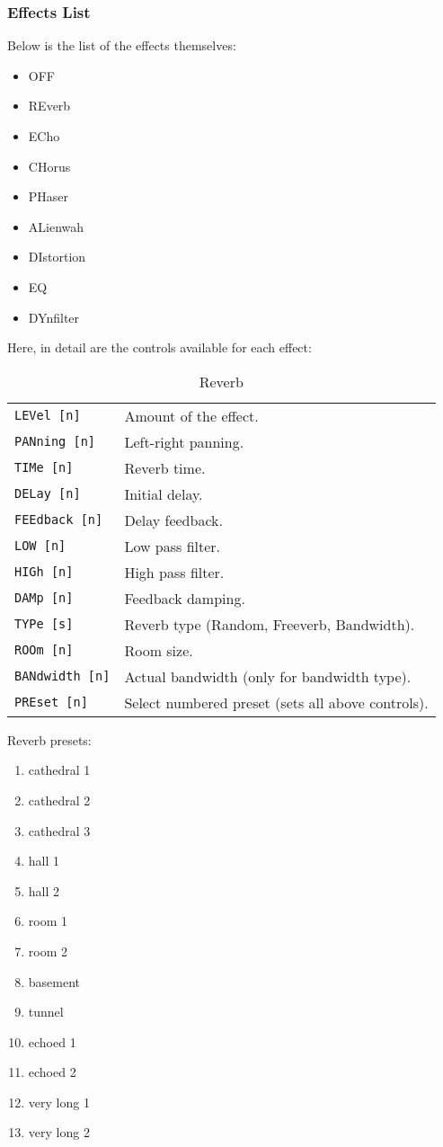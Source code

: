 \subsubsection{Effects List}
\label{subsubsec:command_line_effects_list}
   Below is the list of the effects themselves:
   \begin{itemize}
      \item OFF
      \item REverb
      \item ECho
      \item CHorus
      \item PHaser
      \item ALienwah
      \item DIstortion
      \item EQ
      \item DYnfilter
   \end{itemize}

   Here, in detail are the controls available for each effect:
   \begin{table}[H]
      \centering
      \caption{Reverb}
      \begin{tabular}{l l}
\texttt{LEVel [n]} &
   Amount of the effect. \\
\texttt{PANning [n]} &
   Left-right panning. \\
\texttt{TIMe [n]} &
   Reverb time. \\
\texttt{DELay [n]} &
   Initial delay. \\
\texttt{FEEdback [n]} &
   Delay feedback. \\
\texttt{LOW [n]} &
   Low pass filter. \\
\texttt{HIGh [n]} &
   High pass filter. \\
\texttt{DAMp [n]} &
   Feedback damping. \\
\texttt{TYPe [s]} &
   Reverb type (Random, Freeverb, Bandwidth). \\
\texttt{ROOm [n]} &
   Room size. \\
\texttt{BANdwidth [n]} &
   Actual bandwidth (only for bandwidth type). \\
\texttt{PREset [n]} &
   Select numbered preset (sets all above controls). \\
      \end{tabular}
   \end{table}
   Reverb presets:
   \begin{enumerate}
      \item cathedral 1
      \item cathedral 2
      \item cathedral 3
      \item hall 1
      \item hall 2
      \item room 1
      \item room 2
      \item basement
      \item tunnel
      \item echoed 1
      \item echoed 2
      \item very long 1
      \item very long 2
    \end{enumerate}

